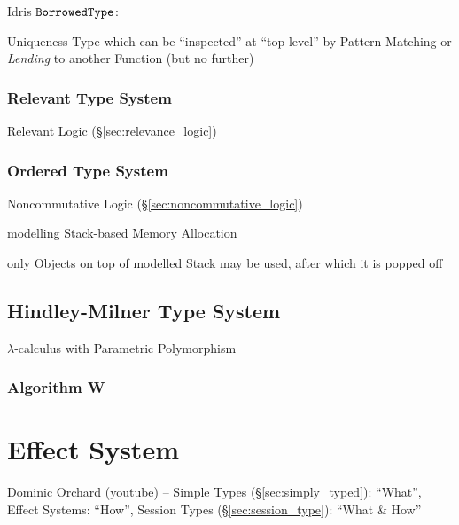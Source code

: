 Idris $\mathtt{BorrowedType}$:

Uniqueness Type which can be ``inspected'' at ``top level'' by Pattern
Matching or \emph{Lending} to another Function (but no further)



\subsubsection{Relevant Type System}\label{sec:relevant_type}

Relevant Logic (\S\ref{sec:relevance_logic})



\subsubsection{Ordered Type System}\label{sec:ordered_type}

Noncommutative Logic (\S\ref{sec:noncommutative_logic})

modelling Stack-based Memory Allocation

only Objects on top of modelled Stack may be used, after which it is
popped off



\subsection{Hindley-Milner Type System}\label{sec:hindley_milner}

$\lambda$-calculus with Parametric Polymorphism



\subsubsection{Algorithm W}\label{sec:algorithm_w}



\section{Effect System}\label{sec:effect_system}

Dominic Orchard (youtube) -- Simple Types (\S\ref{sec:simply_typed}):
``What'', Effect Systems: ``How'', Session Types
(\S\ref{sec:session_type}): ``What \& How''

